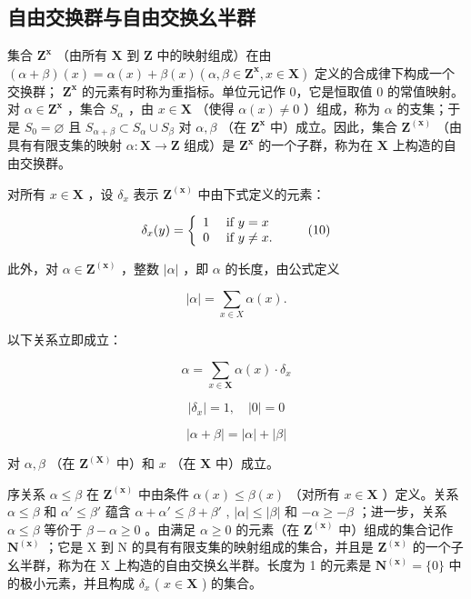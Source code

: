 \subsection{自由交换群与自由交换幺半群}

集合 \(\mathbf{Z}^{\mathbf{x}}\) （由所有 \(\mathbf{X}\) 到 \(\mathbf{Z}\) 中的映射组成）在由 \((\alpha + \beta)(x) = \alpha(x) + \beta(x)(\alpha, \beta \in \mathbf{Z}^{\mathbf{x}}, x \in \mathbf{X})\) 定义的合成律下构成一个交换群； \(\mathbf{Z}^{\mathbf{x}}\) 的元素有时称为重指标。单位元记作 0，它是恒取值 0 的常值映射。对 \(\alpha \in \mathbf{Z}^{\mathbf{x}}\) ，集合 \(S_{\alpha}\) ，由 \(x \in \mathbf{X}\) （使得 \(\alpha(x) \neq 0\) ）组成，称为 \(\alpha\) 的支集；于是 \(S_0 = \varnothing\) 且 \(S_{\alpha + \beta} \subset S_{\alpha} \cup S_{\beta}\) 对 \(\alpha, \beta\) （在 \(\mathbf{Z}^{\mathbf{x}}\) 中）成立。因此，集合 \(\mathbf{Z}^{(\mathbf{x})}\) （由具有有限支集的映射 \(\alpha: \mathbf{X} \to \mathbf{Z}\) 组成）是 \(\mathbf{Z}^{\mathbf{x}}\) 的一个子群，称为在 \(\mathbf{X}\) 上构造的自由交换群。

对所有 \(x \in \mathbf{X}\) ，设 \(\delta_x\) 表示 \(\mathbf{Z}^{(\mathbf{x})}\) 中由下式定义的元素：

\[
\delta_ {x} (y) = \left\{ \begin{array}{l l} 1 & \text { if } y = x \\ 0 & \text { if } y \neq x. \end{array} \right.\tag{10}
\]

此外，对 \(\alpha \in \mathbf{Z}^{(\mathbf{x})}\) ，整数 \(|\alpha|\) ，即 \(\alpha\) 的长度，由公式定义

\[
| \alpha | = \sum_ {x \in X} \alpha (x).\tag{11}
\]

以下关系立即成立：

\[
\alpha = \sum_ {x \in \mathbf {X}} \alpha (x) \cdot \delta_ {x}\tag{12}
\]

\[
\left| \delta_ {x} \right| = 1, \quad \left| 0 \right| = 0\tag{13}
\]

\[
| \alpha + \beta | = | \alpha | + | \beta |\tag{14}
\]

对 \(\alpha, \beta\) （在 \(\mathbf{Z}^{(\mathbf{X})}\) 中）和 \(x\) （在 \(\mathbf{X}\) 中）成立。

序关系 \(\alpha \leqslant \beta\) 在 \(\mathbf{Z}^{(\mathbf{x})}\) 中由条件 \(\alpha(x) \leqslant \beta(x)\) （对所有 \(x \in \mathbf{X}\) ）定义。关系 \(\alpha \leqslant \beta\) 和 \(\alpha' \leqslant \beta'\) 蕴含 \(\alpha + \alpha' \leqslant \beta + \beta'\) , \(|\alpha| \leqslant |\beta|\) 和 \(-\alpha \geqslant -\beta\) ；进一步，关系 \(\alpha \leqslant \beta\) 等价于 \(\beta - \alpha \geqslant 0\) 。由满足 \(\alpha \geqslant 0\) 的元素（在 \(\mathbf{Z}^{(\mathbf{x})}\) 中）组成的集合记作 \(\mathbf{N}^{(\mathbf{x})}\) ；它是 X 到 N 的具有有限支集的映射组成的集合，并且是 \(\mathbf{Z}^{(\mathbf{x})}\) 的一个子幺半群，称为在 X 上构造的自由交换幺半群。长度为 1 的元素是 \(\mathbf{N}^{(\mathbf{x})} = \{0\}\) 中的极小元素，并且构成 \(\delta_x\) ( \(x \in \mathbf{X}\) ) 的集合。

